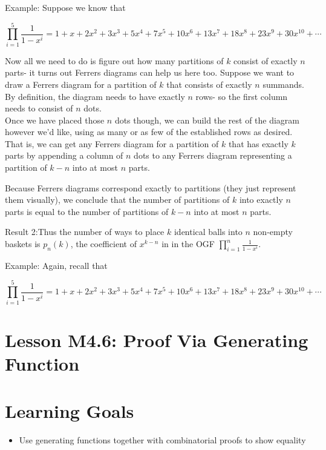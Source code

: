 \documentclass{article}
\theoremstyle{definition}
\begin{document}
Example: Suppose we know that

$$
\prod_{i=1}^{5} \frac{1}{1-x^{i}}=1+x+2 x^{2}+3 x^{3}+5 x^{4}+7 x^{5}+10 x^{6}+13 x^{7}+18 x^{8}+23 x^{9}+30 x^{10}+\cdots
$$


Now all we need to do is figure out how many partitions of $k$ consist of exactly $n$ parts- it turns out Ferrers diagrams can help us here too. Suppose we want to draw a Ferrers diagram for a partition of $k$ that consists of exactly $n$ summands. By definition, the diagram needs to have exactly $n$ rows- so the first column needs to consist of $n$ dots.\\


Once we have placed those $n$ dots though, we can build the rest of the diagram however we'd like, using as many or as few of the established rows as desired. That is, we can get any Ferrers diagram for a partition of $k$ that has exactly $k$ parts by appending a column of $n$ dots to any Ferrers diagram representing a partition of $k-n$ into at most $n$ parts.

Because Ferrers diagrams correspond exactly to partitions (they just represent them visually), we conclude that the number of partitions of $k$ into exactly $n$ parts is equal to the number of partitions of $k-n$ into at most $n$ parts.

Result 2:Thus the number of ways to place $k$ identical balls into $n$ non-empty baskets is $p_{n}(k)$, the coefficient of $x^{k-n}$ in in the OGF $\prod_{i=1}^{n} \frac{1}{1-x^{i}}$.

Example: Again, recall that

$$
\prod_{i=1}^{5} \frac{1}{1-x^{i}}=1+x+2 x^{2}+3 x^{3}+5 x^{4}+7 x^{5}+10 x^{6}+13 x^{7}+18 x^{8}+23 x^{9}+30 x^{10}+\cdots
$$










\newpage


\section*{Lesson M4.6: Proof Via Generating Function}
\section*{Learning Goals}
\begin{itemize}
  \item Use generating functions together with combinatorial proofs to show equality
\end{itemize}
\end{document}
